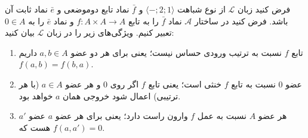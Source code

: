 فرض کنید زبان
$\mathcal{L}$
از نوع شباهت
$\langle\mathord{-};2;1\rangle$
و
$\bar f$
نماد تابع دوموضعی
و
$\bar e$
نماد ثابت آن باشد. فرض کنید در ساختار
$\mathcal{A}$
نماد
$\bar f$
را به تابع
$f\colon A\times A\to A$
و نماد
$\bar e$
را به
$0\in A$
تعبیر کنیم.
ویژگی‌های زیر را در زبان
$\mathcal{L}$
بیان کنید:
\begin{enumerate}[label=(\alph*)]
    \item تابع $f$ نسبت به ترتیب ورودی حساس نیست؛ یعنی برای هر دو عضو
    $a,b\in A$
    داریم $f(a,b)=f(b,a)$.
    \item عضو $0$ نسبت به تابع $f$ خنثی است؛ یعنی تابع $f$ اگر روی
    $0$
    و هر عضو $a\in A$
    (با هر ترتیبی)
    اعمال شود خروجی همان $a$ خواهد بود.
    \item هر عضو
    $A$ نسبت به عمل $f$ وارون راست دارد؛ یعنی برای هر عضو $a$ عضو $a'$ هست که $f(a,a')=0$.
\end{enumerate}

